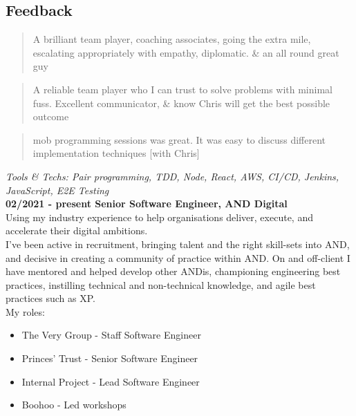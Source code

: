 \subsection{Feedback}

\begin{quote}
A brilliant team player, coaching associates, going the extra mile, escalating appropriately with empathy, diplomatic. \& an all round great guy
\end{quote}

\begin{quote}
A reliable team player who I can trust to solve problems with minimal fuss. Excellent communicator, \& know Chris will get the best possible outcome
\end{quote}

\begin{quote}
mob programming sessions was great. It was easy to discuss different implementation techniques [with Chris]
\end{quote}

\emph{Tools \& Techs: Pair programming, TDD, Node, React, AWS, CI/CD, Jenkins, JavaScript, E2E Testing}\\

\textbf{02/2021 - present \hspace{2.75em}Senior Software Engineer, AND Digital}\\

Using my industry experience to help organisations deliver, execute, and accelerate their digital ambitions.\\

I've been active in recruitment, bringing talent and the right skill-sets into AND, and decisive in creating a community of practice within AND. On and off-client I have mentored and helped develop other ANDis, championing engineering best practices, instilling technical and non-technical knowledge, and agile best practices such as XP.\\

My roles:\\

\begin{itemize}
  \item The Very Group   - Staff Software Engineer
  \item Princes' Trust   - Senior Software Engineer
  \item Internal Project - Lead Software Engineer
  \item Boohoo           - Led workshops
\end{itemize}

